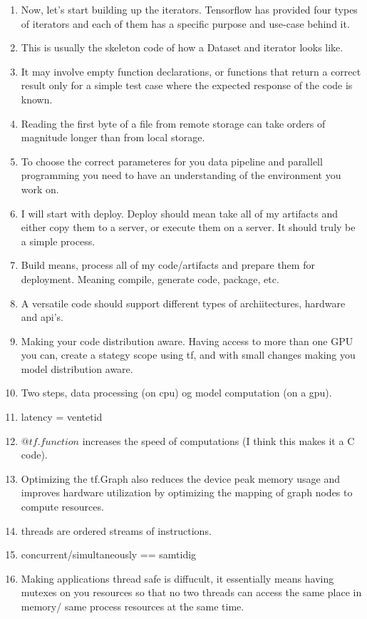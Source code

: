\begin{enumerate}
    \item Now, let’s start building up the iterators. Tensorflow has provided four types of iterators and each of them has a specific purpose and use-case behind it.
    \item This is usually the skeleton code of how a Dataset and iterator looks like.
    \item It may involve empty function declarations, or functions that return a correct result only for a simple test case where the expected response of the code is known.
    \item Reading the first byte of a file from remote storage can take orders of magnitude longer than from local storage.
    
    \item To choose the correct parameteres for you data pipeline and parallell programming you need to have an understanding of the environment you work on.
    \item I will start with deploy. Deploy should mean take all of my artifacts and either copy them to a server, or execute them on a server. It should truly be a simple process.
    \item Build means, process all of my code/artifacts and prepare them for deployment. Meaning compile, generate code, package, etc.
    \item A versatile code should support different types of archiitectures, hardware and api's.
    \item Making your code distribution aware. Having access to more than one GPU you can, create a stategy scope using tf, and with small changes making you model distribution aware.
    \item Two steps, data processing (on cpu) og model computation (on a gpu).
    \item latency = ventetid
    \item $@tf.function$ increases the speed of computations (I think this makes it a C code).
    \item Optimizing the tf.Graph also reduces the device peak memory usage and improves hardware utilization by optimizing the mapping of graph nodes to compute resources. 
    \item threads are ordered streams of instructions.
    \item concurrent/simultaneously == samtidig
    \item Making applications thread safe is diffucult, it essentially means having mutexes on you resources so that no two threads can access the same place in memory/ same process resources at the same time.
\end{enumerate}



